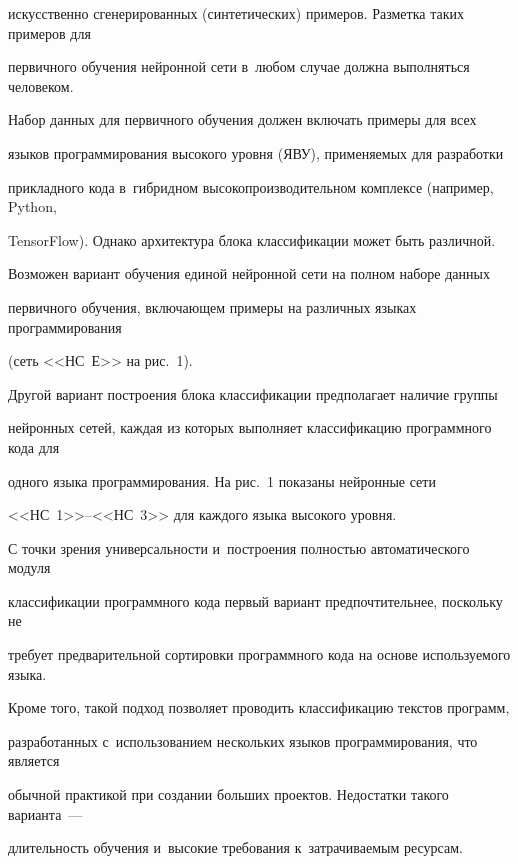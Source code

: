 искусственно сгенерированных (синтетических) примеров. Разметка таких примеров для 

первичного обучения нейронной сети в~любом случае должна выполняться человеком.

      

      Набор данных для первичного обучения должен включать примеры для всех 

языков программирования высокого уровня (ЯВУ), применяемых для разработки 

прикладного кода в~гибридном высокопроизводительном комплексе (например, Python, 

TensorFlow). Однако архитектура блока классификации может быть различной. 





      

      Возможен вариант обучения единой нейронной сети на полном наборе данных 

первичного обучения, включающем примеры на различных языках программирования 

(сеть <<НС~Е>> на рис.~1).

      

       Другой вариант построения блока классификации предполагает наличие группы 

нейронных сетей, каждая из которых выполняет классификацию программного кода для 

одного языка программирования. На рис.~1 показаны нейронные сети  

<<НС~1>>--<<НС~3>> для каждого языка высокого уровня.

      

      С точки зрения универсальности и~построения полностью автоматического модуля 

классификации программного кода первый вариант предпочтительнее, поскольку не 

требует предварительной сортировки программного кода на основе используемого языка. 

Кроме того, такой подход позволяет проводить классификацию текстов программ, 

разработанных с~использованием нескольких языков программирования, что является 

обычной практикой при создании больших проектов. Недостатки такого варианта~--- 

длительность обучения и~высокие требования к~затрачиваемым ресурсам.

      

